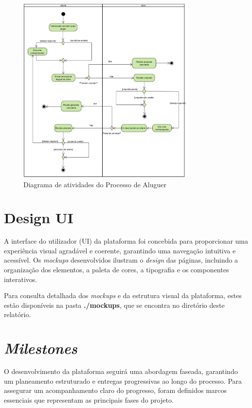 \documentclass[a4paper, 12pt]{article} %
\begin{document}
\begin{figure}[ht]
	\centering
	\includegraphics[width=0.8\textwidth]{../images/activity-diagram-rentals.png}
	\caption{Diagrama de atividades do Processo de Aluguer}
	\label{fig:diagrama_atividades_aluguer}
\end{figure}


\newpage
\clearpage
\section{Design UI}
A interface do utilizador (UI) da plataforma foi concebida para proporcionar uma experiência visual agradável e coerente, garantindo uma navegação intuitiva e acessível. Os \textit{mockups} desenvolvidos ilustram o \textit{design} das páginas, incluindo a organização dos elementos, a paleta de cores, a tipografia e os componentes interativos.

Para consulta detalhada dos \textit{mockups} e da estrutura visual da plataforma, estes estão disponíveis na pasta \textbf{./mockups}, que se encontra no diretório deste relatório.


\newpage
\section{\textit{Milestones}}
O desenvolvimento da plataforma seguirá uma abordagem faseada, garantindo um planeamento estruturado e entregas progressivas ao longo do processo. Para assegurar um acompanhamento claro do progresso, foram definidos marcos essenciais que representam as principais fases do projeto.
\end{document}
